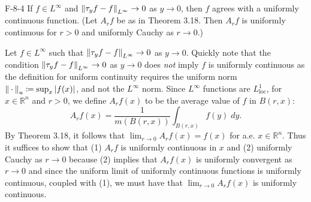 \documentclass{article}
\begin{document}
	\begin{prb}{F-8-4}
		If $f \in L^{\infty}$ and $\left\Vert \tau_{y}f- f \right\Vert_{L^{\infty}} \to 0$ as $y \to 0$, then $f$ agrees with a uniformly continuous function. (Let $A_{r}f$ be as in Theorem 3.18. Then $A_{r}f$ is uniformly continuous for $r > 0$ and uniformly Cauchy as $r \to 0$.)
	\end{prb}
	Let $f \in L^{\infty}$ such that $\left\Vert \tau_{y}f - f \right\Vert_{L^{\infty}} \to 0$ as $y\to 0$. Quickly note that the condition $\left\Vert \tau_{y}f - f \right\Vert_{L^{\infty}} \to 0$ as $y \to 0$ does \textit{not} imply $f$ is uniformly continuous as the definition for uniform continuity requires the uniform norm $\left\Vert \hspace{2pt}\cdot\hspace{2pt} \right\Vert_{u} \coloneqq \sup_{x}|f(x)|$, and not the $L^{\infty}$ norm. Since $L^{\infty}$ functions are $L^{1}_{\text{loc}}$, for $x \in \mathbb{R}^{n}$ and $r > 0$, we define $A_{r}f(x)$ to be the average value of $f$ in $B(r, x)$: 
	\begin{equation*}
		A_{r}f(x) = \frac{1}{m(B(r,x))} \int_{B(r,x)}f(y)\;dy. 
	\end{equation*}
	By Theorem 3.18, it follows that $\lim_{r \to 0}A_{r}f(x) = f(x)$ for a.e. $x \in \mathbb{R}^{n}$. Thus it suffices to show that (1) $A_{r}f$ is uniformly continuous in $x$ and (2) uniformly Cauchy as $r \to 0$ because (2) implies that $A_{r}f(x)$ is uniformly convergent as $r \to 0$ and since the uniform limit of uniformly continuous functions is uniformly continuous, coupled with (1), we must have that $\lim_{r \to 0}A_{r}f(x)$ is uniformly continuous. \vspace{-0.25cm}
\end{document}
